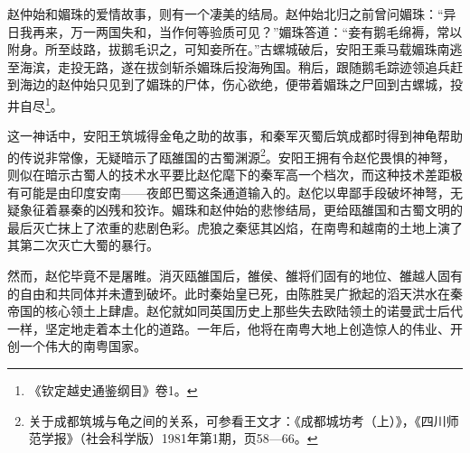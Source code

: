 赵仲始和媚珠的爱情故事，则有一个凄美的结局。赵仲始北归之前曾问媚珠：“异日我再来，万一两国失和，当作何等验质可见？”媚珠答道：“妾有鹅毛绵褥，常以附身。所至歧路，拔鹅毛识之，可知妾所在。”古螺城破后，安阳王乘马载媚珠南逃至海滨，走投无路，遂在拔剑斩杀媚珠后投海殉国。稍后，跟随鹅毛踪迹领追兵赶到海边的赵仲始只见到了媚珠的尸体，伤心欲绝，便带着媚珠之尸回到古螺城，投井自尽\footnote{《钦定越史通鉴纲目》卷1。}。

这一神话中，安阳王筑城得金龟之助的故事，和秦军灭蜀后筑成都时得到神龟帮助的传说非常像，无疑暗示了瓯雒国的古蜀渊源\footnote{关于成都筑城与龟之间的关系，可参看王文才：《成都城坊考（上）》，《四川师范学报》（社会科学版）1981年第1期，页58—66。}。安阳王拥有令赵佗畏惧的神弩，则似在暗示古蜀人的技术水平要比赵佗麾下的秦军高一个档次，而这种技术差距极有可能是由印度安南——夜郎巴蜀这条通道输入的。赵佗以卑鄙手段破坏神弩，无疑象征着暴秦的凶残和狡诈。媚珠和赵仲始的悲惨结局，更给瓯雒国和古蜀文明的最后灭亡抹上了浓重的悲剧色彩。虎狼之秦惩其凶焰，在南粤和越南的土地上演了其第二次灭亡大蜀的暴行。

然而，赵佗毕竟不是屠睢。消灭瓯雒国后，雒侯、雒将们固有的地位、雒越人固有的自由和共同体并未遭到破坏。此时秦始皇已死，由陈胜吴广掀起的滔天洪水在秦帝国的核心领土上肆虐。赵佗就如同英国历史上那些失去欧陆领土的诺曼武士后代一样，坚定地走着本土化的道路。一年后，他将在南粤大地上创造惊人的伟业、开创一个伟大的南粤国家。
